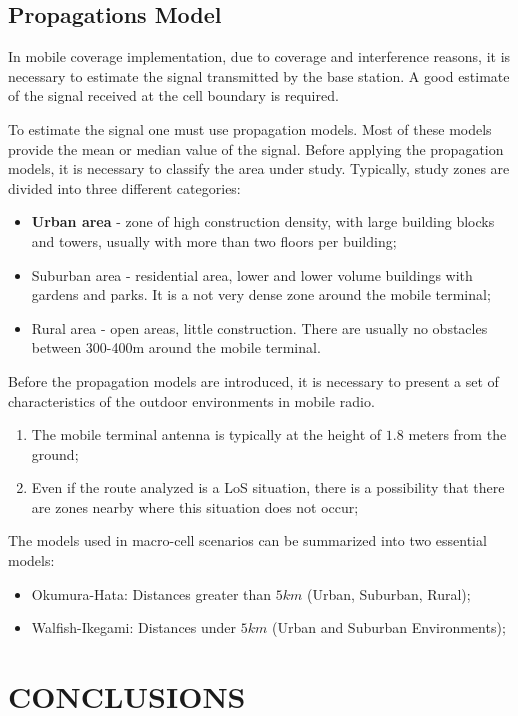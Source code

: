 \documentclass[letterpaper, 10 pt, conference]{ieeeconf}  %
\begin{document}
\subsection{Propagations Model}
In mobile coverage implementation, due to coverage and interference reasons, it is necessary to estimate the signal transmitted by the base station. A good estimate of the signal received at the cell boundary is required.\par\noindent
To estimate the signal one must use propagation models. Most of these models provide the mean or median value of the signal. 
Before applying the propagation models, it is necessary to classify the area under study. Typically, study zones are divided into three different categories:
\begin {itemize}
    \item \textbf{Urban area} - zone of high construction density, with large building blocks and towers, usually with more than two floors per building;
    \item Suburban area - residential area, lower and lower volume buildings with gardens and parks. It is a not very dense zone around the mobile terminal;
    \item Rural area - open areas, little construction. There are usually no obstacles between 300-400m around the mobile terminal.
\end {itemize} \par\noindent
Before the propagation  models are introduced, it is necessary to present a set of characteristics of the outdoor environments in mobile radio.
\begin {enumerate}
    \item The mobile terminal antenna is typically at the height of $ 1.8 $ meters from the ground;
    \item Even if the route analyzed is a LoS situation, there is a possibility that there are zones nearby where this situation does not occur;
\end {enumerate}
The models used in macro-cell scenarios can be summarized into two essential models:
    \begin {itemize}
        \item Okumura-Hata: Distances greater than $ 5km $ (Urban, Suburban, Rural);
        \item Walfish-Ikegami: Distances under $ 5km $ (Urban and Suburban Environments);
    \end {itemize}

\section{CONCLUSIONS}
\end{document}

